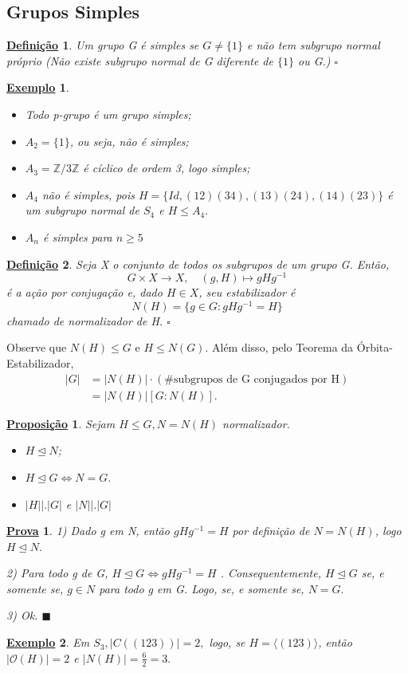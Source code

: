 \documentclass{article}
\newtheorem*{def*}{\underline{Defini\c c\~ao}}
\newtheorem*{prop*}{\underline{Proposi\c c\~ao}}
\newtheorem{example*}{\underline{Exemplo}}
\newtheorem*{proof*}{\underline{Prova}}
\renewcommand\qedsymbol{$\blacksquare$}
\begin{document}
\subsection{Grupos Simples}
 \begin{def*}
   Um grupo G é simples se \(G\neq\{1\}\) e não tem subgrupo normal próprio (Não
  existe subgrupo normal de G diferente de \(\{1\}\) ou G.) \(\square\)
 \end{def*}
\begin{example*}
 \begin{itemize}
    \item Todo p-grupo é um grupo simples;
    \item \(A_{2}=\{1\}\), ou seja, não é simples;
    \item \(A_{3} = \mathbb{Z}/3 \mathbb{Z}\) é cíclico de ordem 3, logo simples;
    \item \(A_{4}\) não é simples, pois \(H = \{Id, (12)(34), (13)(24), (14)(23)\}\)
  é um subgrupo normal de \(S_{4}\) e \(H\leq A_{4}.\)
    \item \(A_{n}\) é simples para \(n\geq 5\)
 \end{itemize}
\end{example*}
\begin{def*}
  Seja X o conjunto de todos os subgrupos de um grupo G. Então, 
    \[
      G\times X\rightarrow X,\quad (g, H)\mapsto gHg^{-1}
    \]
  é a a\c cão por conjuga\c cão e, dado \(H\in X\), seu estabilizador é 
    \[
      N(H) = \{g\in G: gHg^{-1}=H\}
    \]
  chamado de normalizador de H. \(\square\)
\end{def*}
  Observe que \(N(H)\leq G\) e \(H\leq N(G)\). Além disso, pelo Teorema da Órbita-Estabilizador,
 \begin{align*}
   |G| &= |N(H)|\cdot (\#\text{subgrupos de G conjugados por H})\\
       &= |N(H)|[G:N(H)].
 \end{align*}
\begin{prop*}
  Sejam \(H\leq G, N = N(H)\) normalizador.
 \begin{itemize}
   \item[1)] \(H \trianglelefteq N\);
     \item[2)] \(H \trianglelefteq{G} \Longleftrightarrow N = G.\)
       \item[3)] \(|H|\bigl|\bigr.|G|\) e \(|N|\bigl|\bigr.|G|\)
 \end{itemize}
\end{prop*}
\begin{proof*}
  1) Dado g em N, então \(gHg^{-1}=H\) por defini\c cão de \(N = N(H)\), logo
 \(H \trianglelefteq{N}.\)
  
  2) Para todo g de G, \(H \trianglelefteq{G} \Longleftrightarrow gHg^{-1} = H\) .
Consequentemente, \(H \trianglelefteq{G}\) se, e somente se, \(g\in N\) para todo g em G.
Logo, se, e somente se, \(N = G.\)

  3) Ok. \qedsymbol
\end{proof*}
\begin{example*}
  Em \(S_{3}, |C((123))| = 2,\) logo, se \(H = \langle(123)\rangle\), então \(|\mathcal{O}(H)| = 2\) e
 \(|N(H)| = \frac{6}{2} = 3.\)
\end{example*}
\end{document}

